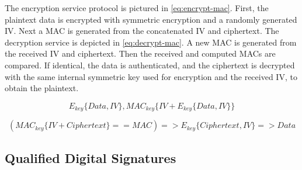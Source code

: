 The encryption service protocol is pictured in \ref{eq:encrypt-mac}.
First, the plaintext data is encrypted with symmetric encryption and a randomly generated IV. Next a MAC is generated from the concatenated IV and ciphertext.
The decryption service is depicted in \ref{eq:decrypt-mac}.
A new MAC is generated from the received IV and ciphertext. Then the received and computed MACs are compared. If identical, the data is authenticated, and the ciphertext is decrypted with the same internal symmetric key used for encryption and the received IV, to obtain the plaintext.

\begin{equation}
	\label{eq:encrypt-mac}
	E_{key}\{Data, IV\}, MAC_{key}\{IV+E_{key}\{Data, IV\}\}
\end{equation}

\begin{equation}
	\label{eq:decrypt-mac}
	(MAC_{key}\{IV+Ciphertext\} == MAC) => E_{key}\{Ciphertext, IV\} => Data
\end{equation}


\subsection{Qualified Digital Signatures}\label{chap:arch:services:signatures}


